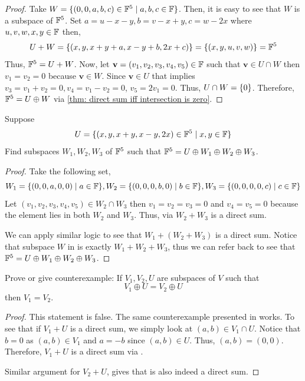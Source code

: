 \begin{proof}
    Take $W= \{(0,0,a,b,c) \in \mathbb{F}^5 \mid a,b,c \in \mathbb{F}\}$. Then, it is easy to see that $W$ is a subspace of $\mathbb{F}^5$. 
    Set $a=u-x-y,b=v-x+y,c=w-2x$ where $u,v,w,x,y \in \mathbb{F}$ then,
    \[ U+W = \{(x,y,x+y+a,x-y+b,2x+c)\} = \{(x,y,u,v,w)\} = \mathbb{F}^5 \]
    Thus, $\mathbb{F}^5 = U + W$.   
    Now, let $\mathbf{v}= (v_1,v_2,v_3,v_4,v_5) \in \mathbb{F}$ such that $\mathbf{v} \in U \cap W$ then $v_1=v_2=0$ because $\mathbf{v} \in W$.
    Since $\mathbf{v} \in U$ that implies \mbox{$v_3= v_1+v_2= 0, v_4 =  v_1-v_2 = 0$}, $v_5=2v_1=0$.
    Thus, $U \cap W = \{0\}$. Therefore, $\mathbb{F}^5 = U \oplus W$ via \cref{thm: direct sum iff intersection is zero}.
\end{proof}

\begin{exercise}
    Suppose
    \[ U = \{(x,y,x+y,x-y,2x) \in \mathbb{F}^5 \mid x,y \in \mathbb{F}\} \]
    Find subspaces $W_1,W_2,W_3$ of $\mathbb{F}^5$ such that $\mathbb{F}^5 = U \oplus W_1 \oplus W_2 \oplus W_3$.
\end{exercise}

\begin{proof}
    Take the following set,
    \[ W_1 = \{(0,0,a,0,0) \mid a \in \mathbb{F}\}, W_2 = \{(0,0,0,b,0) \mid b \in \mathbb{F} \}, W_3=\{(0,0,0,0,c) \mid c \in \mathbb{F} \} \]
    Let $(v_1,v_2,v_3,v_4,v_5) \in W_2 \cap W_3$ then $v_1=v_2=v_3=0$ and $v_4=v_5=0$ because 
    the element lies in both $W_2$ and $W_3$. Thus, via  $W_2+W_3$ is a direct sum.

    We can apply similar logic to see that $W_1 + (W_2+W_3)$ is a direct sum. Notice that subspace $W$ in  is exactly $W_1 + W_2 + W_3$, thus we can refer back to see that $\mathbb{F}^5 = U \oplus W_1 \oplus W_2 \oplus W_3$.
\end{proof}

\begin{exercise}
    Prove or give counterexample: If $V_1,V_2,U$ are subspaces of $V$ such that 
    \[ V_1 \oplus U = V_2 \oplus U \]
    then $V_1 = V_2$.
\end{exercise}

\begin{proof}
    This statement is false. The same counterexample presented in  works. To see that if $V_1+U$ is a direct sum,
    we simply look at $(a,b) \in V_1 \cap U$. Notice that $b = 0$ as $(a,b) \in V_1$ and $a=-b$ since $(a,b) \in U$. Thus, $(a,b)=(0,0)$.
    Therefore, $V_1 + U$ is a direct sum via .

    Similar argument for $V_2 + U$, gives that is also indeed a direct sum.
\end{proof}

